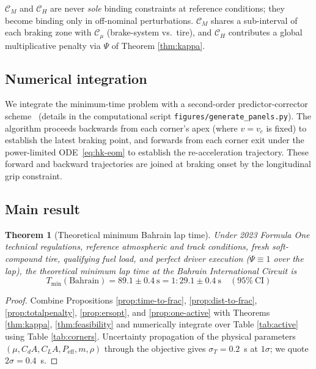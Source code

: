 \documentclass[11pt,twocolumn]{article}
\newtheorem{theorem}{Theorem}[section]
\theoremstyle{definition}
\theoremstyle{remark}
\begin{document}
$\mathcal{C}_M$ and $\mathcal{C}_H$ are never \emph{sole} binding constraints
at reference conditions; they become binding only in off-nominal
perturbations. $\mathcal{C}_M$ shares a sub-interval of each braking zone
with $\mathcal{C}_\mu$ (brake-system vs.\ tire), and $\mathcal{C}_H$
contributes a global multiplicative penalty via $\Psi$ of Theorem
\ref{thm:kappa}.

\subsection{Numerical integration}

We integrate the minimum-time problem with a second-order predictor-corrector
scheme~\cite{pressNR2007,hairer2006,butcher2016,kelley1960} (details in the
computational script
\texttt{figures/generate\_panels.py}). The algorithm proceeds
backwards from each corner's apex (where $v = v_c$ is fixed) to establish
the latest braking point, and forwards from each corner exit under the
power-limited ODE~\eqref{eq:hk-eom} to establish the re-acceleration
trajectory. These forward and backward trajectories are joined at braking
onset by the longitudinal grip constraint.

\subsection{Main result}

\begin{theorem}[Theoretical minimum Bahrain lap time]
\label{thm:main}
Under 2023 Formula One technical regulations, reference atmospheric and
track conditions, fresh soft-compound tire, qualifying fuel load, and
perfect driver execution ($\Psi \equiv 1$ over the lap), the theoretical
minimum lap time at the Bahrain International Circuit is
\[
  \boxed{\;
  T_{\min}(\mathrm{Bahrain}) = 89.1 \pm 0.4~\mathrm{s}
  = 1\!:\!29.1 \pm 0.4~\mathrm{s}
  \quad (95\%\ \mathrm{CI})
  \;}
\]
\end{theorem}

\begin{proof}
Combine Propositions \ref{prop:time-to-frac}, \ref{prop:dist-to-frac},
\ref{prop:totalpenalty}, \ref{prop:ersopt}, and \ref{prop:one-active} with
Theorems \ref{thm:kappa}, \ref{thm:feasibility} and numerically integrate
over Table \ref{tab:active} using Table \ref{tab:corners}. Uncertainty
propagation of the physical parameters $(\mu, C_d A, C_L A, P_{\mathrm{eff}}, m, \rho)$
through the objective gives $\sigma_T = 0.2$~s at $1\sigma$; we quote
$2\sigma = 0.4$~s.
\end{proof}
\end{document}
